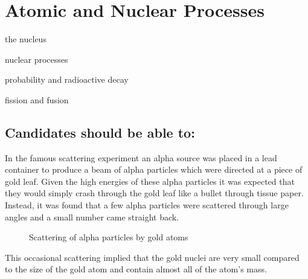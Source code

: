 \documentclass[main.tex]{subfiles}
\begin{document}
\chapter{Atomic and Nuclear Processes}
\begin{content}
  \item the nucleus
  \item nuclear processes
  \item probability and radioactive decay
  \item fission and fusion
\end{content}
\section*{Candidates should be able to:}

In the famous scattering experiment an alpha source was placed in a lead container to produce a beam of alpha particles which were directed at a piece of gold leaf. Given the high energies of these alpha particles it was expected that they would simply crash through the gold leaf like a bullet through tissue paper. Instead, it was found that a few alpha particles were scattered through large angles and a small number came straight back.
\newpage
\begin{figure}[h]
  \begin{center}
  \end{center}
  \caption{Scattering of alpha particles by gold atoms}
  \label{fig:scattering}
\end{figure}

This occasional scattering implied that the gold nuclei are very small compared to the size of the gold atom and contain almost all of the atom's mass.
\end{document}
